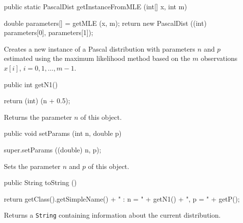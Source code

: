 \begin{htmlonly}
\end{htmlonly}
\begin{code}

   public static PascalDist getInstanceFromMLE (int[] x, int m)\begin{hide} {
      double parameters[] = getMLE (x, m);
      return new PascalDist ((int) parameters[0], parameters[1]);
   }\end{hide}
\end{code}
\begin{tabb}
   Creates a new instance of a Pascal distribution with parameters $n$ and
   $p$ estimated using the maximum likelihood method based on the $m$
   observations $x[i]$, $i = 0, 1, \ldots, m-1$.
\end{tabb}
\begin{htmlonly}
\end{htmlonly}
\begin{code}

   public int getN1()\begin{hide} {
      return (int) (n + 0.5);
   }
   \end{hide}
\end{code}
\begin{tabb} Returns the parameter $n$ of this object.
\end{tabb}
\begin{code}

   public void setParams (int n, double p)\begin{hide} {
      super.setParams ((double) n, p);
   }\end{hide}
\end{code}
\begin{tabb} Sets the parameter $n$ and $p$ of this object.
\end{tabb}

\begin{hide}\begin{code}

   public String toString ()\begin{hide} {
      return getClass().getSimpleName() + " : n = " + getN1() + ", p = " + getP();
   }\end{hide}
\end{code}
\begin{tabb}
   Returns a \texttt{String} containing information about the current distribution.
\end{tabb}\end{hide}
\begin{code}\begin{hide}
}\end{hide}
\end{code}
